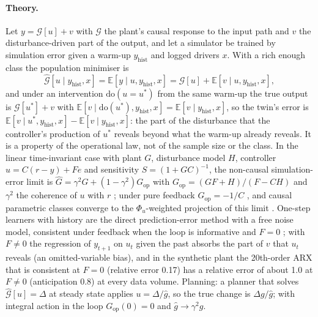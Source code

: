 \documentclass[11pt]{article}
\newcommand{\E}{\mathbb{E}}
\begin{document}
\paragraph{Theory.} Let $y=\mathcal G[u]+v$ with $\mathcal G$ the plant's causal response to the input path and $v$ the disturbance-driven part of the output, and let a simulator be trained by simulation error given a warm-up $y_{\mathrm{hist}}$ and logged drivers $x$. With a rich enough class the population minimiser is
\begin{equation}
\hat{\mathcal G}[u\mid y_{\mathrm{hist}},x]=\E[y\mid u,y_{\mathrm{hist}},x]=\mathcal G[u]+\E[v\mid u,y_{\mathrm{hist}},x],
\label{eq:identity}
\end{equation}
and under an intervention $\mathrm{do}(u=u^*)$ from the same warm-up the true output is $\mathcal G[u^*]+v$ with $\E[v\mid\mathrm{do}(u^*),y_{\mathrm{hist}},x]=\E[v\mid y_{\mathrm{hist}},x]$, so the twin's error is $\E[v\mid u^*,y_{\mathrm{hist}},x]-\E[v\mid y_{\mathrm{hist}},x]$: the part of the disturbance that the controller's production of $u^*$ reveals beyond what the warm-up already reveals. It is a property of the operational law, not of the sample size or the class. In the linear time-invariant case with plant $G$, disturbance model $H$, controller $u=C(r-y)+Fe$ and sensitivity $S=(1+GC)^{-1}$, the non-causal simulation-error limit is $\hat G=\gamma^2G+(1-\gamma^2)G_{\mathrm{op}}$ with $G_{\mathrm{op}}=(GF+H)/(F-CH)$ and $\gamma^2$ the coherence of $u$ with $r$ \citep{forssell1999,ljung1999}; under pure feedback $G_{\mathrm{op}}=-1/C$ \citep{gustavsson1977}, and causal parametric classes converge to the $\Phi_u$-weighted projection of this limit \citep{ljung1999}. One-step learners with history are the direct prediction-error method with a free noise model, consistent under feedback when the loop is informative and $F=0$ \citep{ljung1999,forssell1999}; with $F\neq0$ the regression of $y_{t+1}$ on $u_t$ given the past absorbs the part of $v$ that $u_t$ reveals (an omitted-variable bias), and in the synthetic plant the 20th-order ARX that is consistent at $F=0$ (relative error 0.17) has a relative error of about 1.0 at $F\neq0$ (anticipation 0.8) at every data volume. Planning: a planner that solves $\hat{\mathcal G}[u]=\Delta$ at steady state applies $u=\Delta/\hat g$, so the true change is $\Delta g/\hat g$; with integral action in the loop $G_{\mathrm{op}}(0)=0$ and $\hat g\to\gamma^2 g$.
\end{document}
